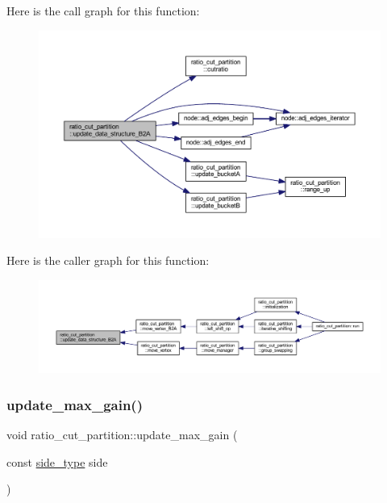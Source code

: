 Here is the call graph for this function\+:\nopagebreak
\begin{figure}[H]
\begin{center}
\leavevmode
\includegraphics[width=350pt]{classratio__cut__partition_a942a3a035f59f2ab0d1d62da3c878eb8_cgraph}
\end{center}
\end{figure}
Here is the caller graph for this function\+:\nopagebreak
\begin{figure}[H]
\begin{center}
\leavevmode
\includegraphics[width=350pt]{classratio__cut__partition_a942a3a035f59f2ab0d1d62da3c878eb8_icgraph}
\end{center}
\end{figure}
\mbox{\label{classratio__cut__partition_afbe33417996a8e040d4d802a1116e134}} 
\subsubsection{\texorpdfstring{update\+\_\+max\+\_\+gain()}{update\_max\_gain()}}
{\footnotesize\ttfamily void ratio\+\_\+cut\+\_\+partition\+::update\+\_\+max\+\_\+gain (\begin{DoxyParamCaption}\item[{const \mbox{\hyperlink{classratio__cut__partition_ace53442bd0c1e21fbf00858ec6f6b456}{side\+\_\+type}}}]{side }\end{DoxyParamCaption})\hspace{0.3cm}{\ttfamily [protected]}}



